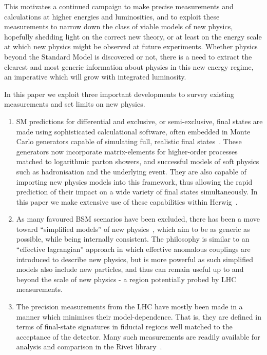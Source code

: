 \documentclass[floatfix]{article}
\begin{document}
This motivates a continued campaign to make precise measurements and calculations at higher energies and 
luminosities, and to exploit these measurements to narrow down the class of viable models of new physics, 
hopefully shedding light on the correct new theory, or at least on the energy scale at which
new physics might be observed at future experiments. Whether physics beyond the Standard Model is discovered 
or not, there is a need to extract the clearest and most generic information about physics in this new energy regime,
an imperative which will grow with integrated luminosity. 

In this paper we exploit three important developments to survey existing measurements and set 
limits on new physics. 

\begin{enumerate}
\item
SM predictions for differential and exclusive, or semi-exclusive, final states are made using sophisticated 
calculational software, often embedded in Monte Carlo generators capable of simulating full, realistic final 
states~\cite{Buckley:2011ms}. These generators now incorporate matrix-elements for higher-order processes
matched to logarithmic parton showers, and successful models of soft physics such as hadronisation and
the underlying event. They are also capable of importing new physics models into this framework, thus allowing
the rapid prediction of their impact on a wide variety of final states simultaneously. 
In this paper we make extensive use of these capabilities within Herwig~\cite{Bahr:2008pv}.
\item
As many favoured BSM scenarios have been excluded, there has been a move toward 
``simplified models'' of new physics~\cite{Alves:2011wf,Abercrombie:2015wmb}, which aim to be as generic as possible, 
while being internally consistent. The philosophy is similar to an ``effective lagrangian'' approach in which effective anomalous
couplings are introduced to describe new physics, but is more powerful as such simplified models also
include new particles, and thus can remain useful up to and beyond the scale of new physics - a region 
potentially probed by LHC measurements.
\item
The precision measurements from the LHC have mostly been made in a manner which minimises their model-dependence. 
That is, they are defined in terms of final-state signatures in fiducial regions well matched to the
acceptance of the detector. Many such measurements are readily available for analysis and
comparison in the Rivet library~\cite{Buckley:2010ar}. 
\end{enumerate}
\end{document}

